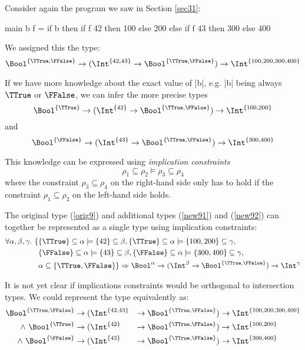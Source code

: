 Consider again the program we saw in Section \ref{sec31}:

\begin{code}
main b f =  if b then
                if  f 42  then  100  else  200
            else
                if  f 43  then  300  else  400
\end{code}

We assigned this the type:
\begin{equation}\label{orig9}
\Bool^{\{\TTrue, \FFalse\}} \to (\Int^{\{42, 43\}}\to\Bool^{\{\TTrue,\FFalse\}})\to \Int^{\{100,200,300,400\}}
\end{equation}

If we have more knowledge about the exact value of |b|, e.g. |b| being always $\TTrue$ or $\FFalse$, we can infer the more precise types
\begin{equation}\label{new91}
\Bool^{\{\TTrue\}} \to (\Int^{\{42\}}\to\Bool^{\{\TTrue,\FFalse\}})\to \Int^{\{100,200\}}
\end{equation}
and
\begin{equation}\label{new92}
\Bool^{\{\FFalse\}} \to (\Int^{\{43\}}\to\Bool^{\{\TTrue,\FFalse\}})\to \Int^{\{300,400\}}
\end{equation}

This knowledge can be expressed using \emph{implication constraints} \[ \rho_1 \subseteq \rho_2 \models \rho_3 \subseteq \rho_4 \]
where the constraint $\rho_3 \subseteq \rho_4$ on the right-hand side only has to hold if the constraint $\rho_1 \subseteq \rho_2$ on the left-hand side holds.

The original type (\ref{orig9}) and additional types (\ref{new91}) and (\ref{new92}) can together be represented as a single type using implication constraints:
\begin{align*}
\forall \alpha, \beta, \gamma.\ \{&\{\TTrue\} \subseteq \alpha \models \{42\} \subseteq \beta, \{\TTrue\} \subseteq \alpha \models \{100, 200\} \subseteq \gamma,\\ &\{\FFalse\} \subseteq \alpha \models \{43\} \subseteq \beta, \{\FFalse\} \subseteq \alpha \models \{300,400\} \subseteq \gamma,\\ &\alpha \subseteq \{\TTrue, \FFalse\}\} \Rightarrow \Bool^{\alpha} \to (\Int^{\beta}\to\Bool^{\{\TTrue,\FFalse\}})\to \Int^{\gamma}
\end{align*}


It is not yet clear if implications constraints would be orthogonal to intersection types. We could represent the type equivalently as:
\begin{align*}
\Bool^{\{\TTrue, \FFalse\}} &\to (\Int^{\{42, 43\}}&\to\Bool^{\{\TTrue,\FFalse\}})&\to \Int^{\{100,200,300,400\}} \\
\land\ \Bool^{\{\TTrue\}} &\to (\Int^{\{42\}}&\to\Bool^{\{\TTrue,\FFalse\}})&\to \Int^{\{100,200\}} \\
\land\ \Bool^{\{\FFalse\}} &\to (\Int^{\{43\}}&\to\Bool^{\{\TTrue,\FFalse\}})&\to \Int^{\{300,400\}}
\end{align*}

